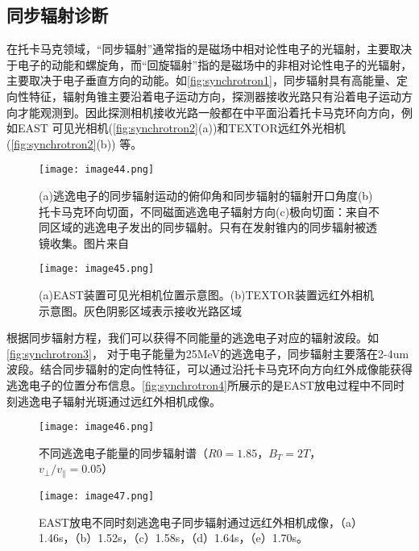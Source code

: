 \subsection{同步辐射诊断}
 在托卡马克领域，“同步辐射”通常指的是磁场中相对论性电子的光辐射，主要取决于电子的动能和螺旋角\cite{RN990}，而“回旋辐射”指的是磁场中的非相对论性电子的光辐射，主要取决于电子垂直方向的动能。如\autoref{fig:synchrotron1}，同步辐射具有高能量、定向性特征，辐射角锥主要沿着电子运动方向，探测器接收光路只有沿着电子运动方向才能观测到。因此探测相机接收光路一般都在中平面沿着托卡马克环向方向，例如EAST 可见光相机(\autoref{fig:synchrotron2}(a))\cite{RN1885}和TEXTOR远红外光相机(\autoref{fig:synchrotron2}(b))\cite{RN1878}	等。
\begin{figure}[ht]
\centering
\texttt{[image: image44.png]}
\caption{\label{fig:synchrotron1}(a)逃逸电子的同步辐射运动的俯仰角和同步辐射的辐射开口角度(b)托卡马克环向切面，不同磁面逃逸电子辐射方向(c)极向切面：来自不同区域的逃逸电子发出的同步辐射。只有在发射锥内的同步辐射被透镜收集。图片来自\cite{RN1878}}
\end{figure}

\begin{figure}[ht]
\centering
\texttt{[image: image45.png]}
\caption{\label{fig:synchrotron2}(a)EAST装置可见光相机位置示意图\cite{RN1885}。(b)TEXTOR装置远红外相机示意图。灰色阴影区域表示接收光路区域\cite{RN1878}	}
\end{figure}
根据同步辐射方程\cite{RN1886}，我们可以获得不同能量的逃逸电子对应的辐射波段。如\autoref{fig:synchrotron3}， 对于电子能量为25MeV的逃逸电子，同步辐射主要落在2-4um波段。结合同步辐射的定向性特征，可以通过沿托卡马克环向方向红外成像\cite{RN995,RN994,RN992}能获得逃逸电子的位置分布信息。\autoref{fig:synchrotron4}所展示的是EAST放电过程中不同时刻逃逸电子辐射光斑通过远红外相机成像\cite{RN1879}。
\begin{figure}[ht]
\centering
\texttt{[image: image46.png]}
\caption{\label{fig:synchrotron3}不同逃逸电子能量的同步辐射谱\cite{RN1879}（$R0=1.85$，$B_T=2T$，$v_⊥/v_∥ =0.05$）}
\end{figure}

\begin{figure}[ht]
\centering
\texttt{[image: image47.png]}
\caption{\label{fig:synchrotron4}EAST放电不同时刻逃逸电子同步辐射通过远红外相机成像\cite{RN1879}，（a）1.46s，（b）1.52s，（c）1.58s，（d）1.64s，（e）1.70s。}
\end{figure}
\clearpage
